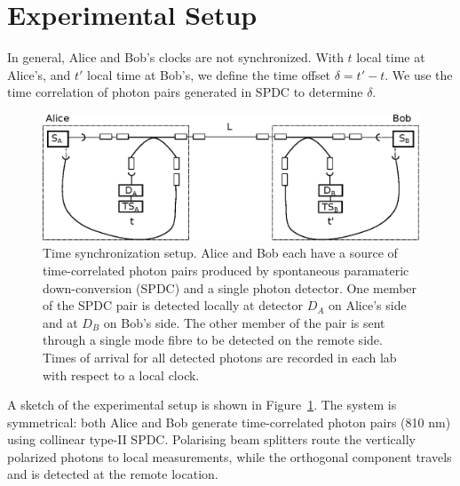 \documentclass[aps,pra,onecolumn, superscriptaddress]{revtex4}
\begin{document}
\section{Experimental Setup}
      
In general, Alice and Bob's clocks are not synchronized.
With $t$ local time at Alice's, and $ t'$ local time at Bob's,
we define the time offset $\delta = t' - t$.
We use the time correlation of photon pairs generated in SPDC to determine $\delta$.

\begin{figure}[htbp]
  \centering
  \includegraphics[width=16cm]{figures/setup_simplified.eps}
  \caption{\label{fig:setup}
  Time synchronization setup. Alice and Bob each have a source of time-correlated photon pairs produced by spontaneous paramateric down-conversion (SPDC) and a single photon detector. One member of the SPDC pair is detected locally at detector $D_A$ on Alice's side and at $D_B$ on Bob's side. The other member of the pair is sent through a single mode fibre to be detected on the remote side. Times of arrival for all detected photons are recorded in each lab with respect to a local clock. 
  }
\end{figure}

A sketch of the experimental setup is shown in Figure~\ref{fig:setup}.
The system is symmetrical: both Alice and Bob generate time-correlated photon pairs (810 nm) using collinear type-II SPDC.
Polarising beam splitters route the vertically polarized photons to local measurements, while the orthogonal component travels and is detected at the remote location.
\end{document}
